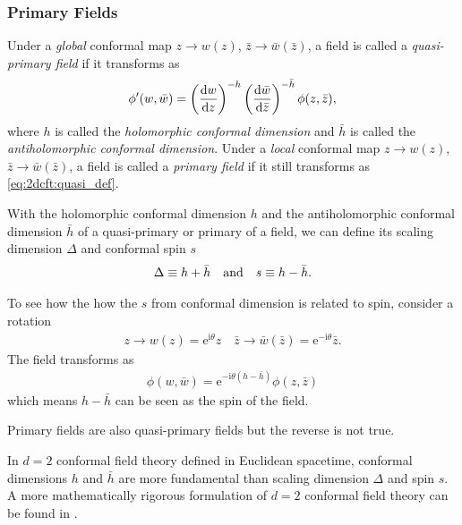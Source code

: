 \documentclass[10pt]{article}
\newcommand{\me}{\mathrm{e}}
\newcommand{\ii}{\mathrm{i}}
\begin{document}
\subsubsection{Primary Fields}
\begin{definition}
    Under a \textit{global} conformal map $z\to w(z)$, $\bar{z}\to \bar{w}(\bar{z})$, a field is called a \textit{quasi-primary field} if it transforms as
    \begin{align}
        \phi'(w,\bar{w})=\left(\dv{w}{z}\right)^{-h}\left(\dv{\bar{w}}{\bar{z}}\right)^{-\bar{h}}\phi(z,\bar{z}),\label{eq:2dcft:quasi_def}
    \end{align}
    where $h$ is called the \textit{holomorphic conformal dimension} and $\bar{h}$ is called the \textit{antiholomorphic conformal dimension}.
    Under a \textit{local} conformal map $z\to w(z)$, $\bar{z}\to \bar{w}(\bar{z})$, a field is called a \textit{primary field} if it still transforms as \cref{eq:2dcft:quasi_def}.
\end{definition}
With the holomorphic conformal dimension $h$ and the antiholomorphic conformal dimension $\bar{h}$ of a quasi-primary or primary of a field, we can define its scaling dimension $\Delta$ and conformal spin $s$
\begin{align}
    \Delta\equiv h+\bar{h}\qand s\equiv h-\bar{h}.\label{eq:holomorphic_conformal_dimension}
\end{align}
\begin{intu}
    To see how the how the $s$ from conformal dimension is related to spin, consider a rotation
    \begin{align}
        z\to w(z)=\me^{\ii\theta}z\quad\bar{z}\to\bar{w}(\bar{z})=\me^{-\ii\theta}\bar{z}.
    \end{align}
    The field transforms as
    \begin{align}
        \phi(w,\bar{w})=\me^{-\ii\theta(h-\bar{h})}\phi(z,\bar{z})
    \end{align}
    which means $h-\bar{h}$ can be seen as the spin of the field.
\end{intu}
\begin{remark}
    Primary fields are also quasi-primary fields but the reverse is not true.

    In $d=2$ conformal field theory defined in Euclidean spacetime, conformal dimensions $h$ and $\bar{h}$ are more fundamental than scaling dimension $\Delta$ and spin $s$.
    A more mathematically rigorous formulation of $d=2$ conformal field theory can be found in \cite{Schottenloher:2008zz}.
\end{remark}
\end{document}
